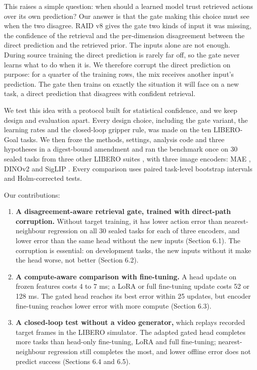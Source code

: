 \documentclass[10pt,twocolumn,letterpaper]{article}
\providecommand{\tightlist}{\setlength{\itemsep}{0pt}\setlength{\parskip}{0pt}}
\begin{document}
This raises a simple question: when should a learned model trust retrieved actions over its own prediction? Our answer is that the gate making this choice must see when the two disagree. RAID v8 gives the gate two kinds of input it was missing, the confidence of the retrieval and the per-dimension disagreement between the direct prediction and the retrieved prior. The inputs alone are not enough. During source training the direct prediction is rarely far off, so the gate never learns what to do when it is. We therefore corrupt the direct prediction on purpose: for a quarter of the training rows, the mix receives another input's prediction. The gate then trains on exactly the situation it will face on a new task, a direct prediction that disagrees with confident retrieval.

We test this idea with a protocol built for statistical confidence, and we keep design and evaluation apart. Every design choice, including the gate variant, the learning rates and the closed-loop gripper rule, was made on the ten LIBERO-Goal tasks. We then froze the methods, settings, analysis code and three hypotheses in a digest-bound amendment and ran the benchmark once on 30 sealed tasks from three other LIBERO suites \cite{ref9}, with three image encoders: MAE \cite{ref10}, DINOv2 \cite{ref11} and SigLIP \cite{ref12}. Every comparison uses paired task-level bootstrap intervals and Holm-corrected tests.

Our contributions:

\begin{enumerate}
\def\labelenumi{\arabic{enumi}.}
\tightlist
\item
  \textbf{A disagreement-aware retrieval gate, trained with direct-path corruption.} Without target training, it has lower action error than nearest-neighbour regression on all 30 sealed tasks for each of three encoders, and lower error than the same head without the new inputs (Section 6.1). The corruption is essential: on development tasks, the new inputs without it make the head worse, not better (Section 6.2).
\item
  \textbf{A compute-aware comparison with fine-tuning.} A head update on frozen features costs 4 to 7 ms; a LoRA or full fine-tuning update costs 52 or 128 ms. The gated head reaches its best error within 25 updates, but encoder fine-tuning reaches lower error with more compute (Section 6.3).
\item
  \textbf{A closed-loop test without a video generator,} which replays recorded target frames in the LIBERO simulator. The adapted gated head completes more tasks than head-only fine-tuning, LoRA and full fine-tuning; nearest-neighbour regression still completes the most, and lower offline error does not predict success (Sections 6.4 and 6.5).
\end{enumerate}
\end{document}
